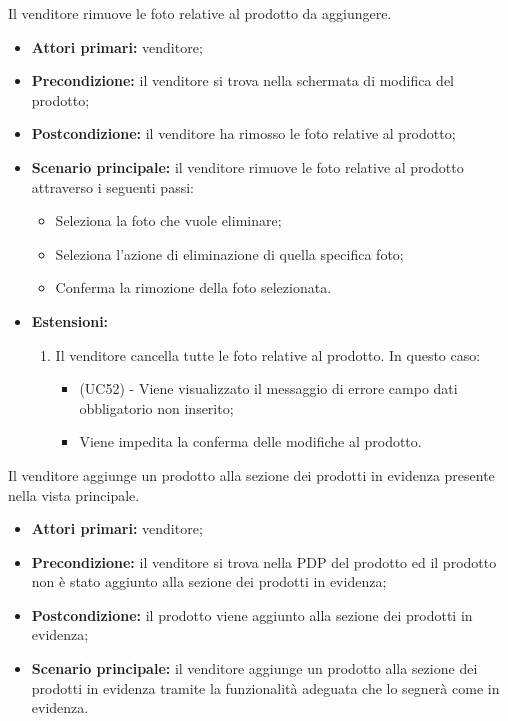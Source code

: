Il venditore rimuove le foto relative al prodotto da aggiungere.
\begin{itemize}
    \item \textbf{Attori primari:} venditore;
    \item \textbf{Precondizione:} il venditore si trova nella schermata di modifica del prodotto;
    \item \textbf{Postcondizione:} il venditore ha rimosso le foto relative al prodotto;
    \item \textbf{Scenario principale:} il venditore rimuove le foto relative al prodotto attraverso i seguenti passi: 
    \begin{itemize}
        \item Seleziona la foto che vuole eliminare;
        \item Seleziona l'azione di eliminazione di quella specifica foto;
        \item Conferma la rimozione della foto selezionata.
    \end{itemize}
    \item \textbf{Estensioni:}
    \begin{enumerate}[label=\lett]
    	\item Il venditore cancella tutte le foto relative al prodotto. In questo caso:
    	\begin{itemize}
    		\item (UC52) - Viene visualizzato il messaggio di errore campo dati obbligatorio non inserito;
    		\item Viene impedita la conferma delle modifiche al prodotto.
    	\end{itemize}
    \end{enumerate}
\end{itemize}

Il venditore aggiunge un prodotto alla sezione dei prodotti in evidenza presente nella vista principale.
\begin{itemize}
    \item \textbf{Attori primari:} venditore;
    \item \textbf{Precondizione:} il venditore si trova nella PDP del prodotto ed il prodotto non è stato aggiunto alla sezione dei prodotti in evidenza;
    \item \textbf{Postcondizione:} il prodotto viene aggiunto alla sezione dei prodotti in evidenza;
    \item \textbf{Scenario principale:} il venditore aggiunge un prodotto alla sezione dei prodotti in evidenza tramite la funzionalità adeguata che lo segnerà come in evidenza.
\end{itemize}

